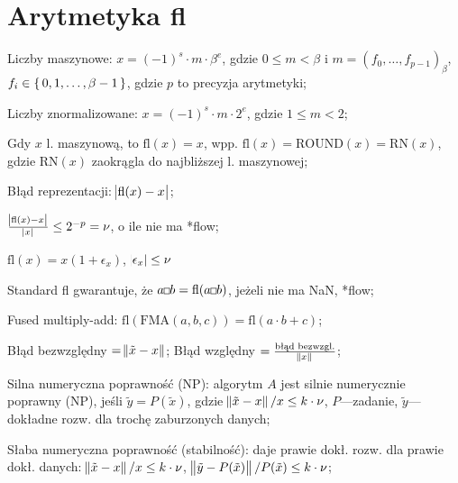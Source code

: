 \section{Arytmetyka fl}

\entry
Liczby maszynowe: $x=(-1)^s \cdot m \cdot \beta^e$, gdzie $0\leq m < \beta$ i $m=(f_0, \ldots, f_{p-1})_\beta$, $f_i\in\set{0,1,\ldots,\beta-1}$, gdzie $p$ to precyzja arytmetyki;

\entry
Liczby znormalizowane: $x=(-1)^s\cdot m \cdot 2^e$, gdzie $1\leq m < 2$;

\entry
Gdy $x$ l. maszynową, to $\mathrm{fl}(x)=x$, wpp. $\mathrm{fl}(x)=\mathrm{ROUND}(x)=\mathrm{RN}(x)$, gdzie $\mathrm{RN}(x)$ zaokrągla do najbliższej l. maszynowej;

\entry
Błąd reprezentacji: $\abs{\mathrm{fl}(x) - x}$;

\entry
$\frac{\abs{\mathrm{fl}(x) - x}}{\abs{x}}\leq 2^{-p}=\nu$, o ile nie ma *flow;

\entry
$\mathrm{fl}(x) = x(1+\epsilon_x)$, $\abs{\epsilon_x}\leq \nu$

\entry
Standard fl gwarantuje, że $a \Hsquare b = \mathrm{fl}(a\Hsquare b)$, jeżeli nie ma NaN, *flow;

\entry
Fused multiply-add:
$\mathrm{fl}(\mathrm{FMA}(a,b,c)) = \mathrm{fl}(a \cdot b + c)$;


\entry
Błąd bezwzględny $=\norm{\tilde{x} - x}$;
\entry
Błąd względny $=\frac{\text{błąd bezwzgl.}}{\norm{x}}$;

\entry
Silna numeryczna poprawność (NP): algorytm $A$ jest silnie numerycznie poprawny (NP), jeśli $\tilde{y} = P(\tilde{x})$, gdzie $\norm{\tilde{x}-x} / x\leq k\cdot\nu$, $P$---zadanie, $\tilde{y}$---dokładne rozw. dla trochę zaburzonych danych;

\entry
Słaba numeryczna poprawność (stabilność): daje prawie dokł. rozw. dla prawie dokł. danych: $\norm{\tilde{x}-x} / x\leq k\cdot\nu$, $\norm{\tilde{y}-P(\tilde{x})} / P(\tilde{x})\leq k\cdot\nu$;
